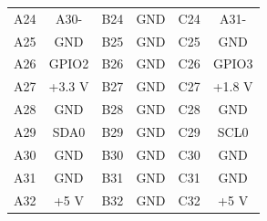 \documentclass[a4paper]{article}
\begin{document}
\begin{table}[h]
\begin{center}
\begin{tabular}{cc|cc|cc}
            A24 & A30- & B24 & GND & C24 & A31- \\
            A25 & GND & B25 & GND & C25 & GND \\
            A26 & GPIO2 & B26 & GND & C26 & GPIO3 \\
            A27 & +3.3 V & B27 & GND & C27 & +1.8 V \\
            A28 & GND & B28 & GND & C28 & GND \\
            A29 & SDA0 & B29 & GND & C29 & SCL0 \\
            A30 & GND & B30 & GND & C30 & GND \\
            A31 & GND & B31 & GND & C31 & GND \\
            A32 & +5 V & B32 & GND & C32 & +5 V \\
            \hline
            \hline
        \end{tabular}
    \end{center}
\end{table}
\end{document}

